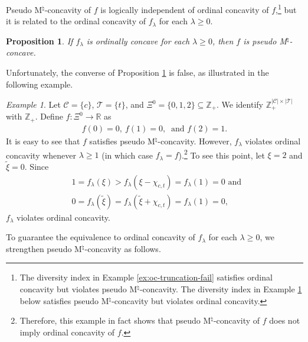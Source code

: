 \documentclass[12pt]{amsart}
\newtheorem{proposition}{Proposition}
\theoremstyle{remark}
\newtheorem{example}{Example}
\begin{document}
Pseudo M$^\natural$-concavity of $f$ is logically independent of ordinal concavity of $f$,\footnote{The diversity index in Example \ref{ex:oc-truncation-fail} satisfies ordinal concavity but violates pseudo M$^\natural$-concavity. The diversity index in Example \ref{ex:truncation-sufficient-fail} below satisfies pseudo M$^\natural$-concavity but violates ordinal concavity.} but it is related to the ordinal concavity of $f_\lambda$ for each $\lambda\geq 0$.

\begin{proposition}\label{prop:truncation-necessary}
If $f_\lambda$ is ordinally concave for each $\lambda\geq 0$, then $f$ is pseudo M$^\natural$-concave.
\end{proposition}

Unfortunately, the converse of Proposition \ref{prop:truncation-necessary} is false, as illustrated in the following example.

\begin{example}\label{ex:truncation-sufficient-fail}
Let $\mathcal{C}=\{c\}$, $\mathcal{T}=\{t\}$, and $\Xi^0=\{0,1,2\}\subseteq \mathbb{Z}_+$. We identify $\mathbb{Z}^{|\mathcal{C}|\times |\mathcal{T}|}_+$ with $\mathbb{Z}_+$. Define
$f:\Xi^0\rightarrow \mathbb{R}$ as
\begin{align*}
f(0)=0, \: f(1)=0, \: \text{ and } f(2)=1.
\end{align*}
It is easy to see that $f$ satisfies pseudo M$^\natural$-concavity. However, $f_\lambda$ violates ordinal concavity whenever $\lambda \geq 1$ (in which case $f_\lambda=f$).\footnote{Therefore,
this example in fact shows that pseudo M$^\natural$-concavity of $f$ does not imply ordinal concavity of $f$.} To see this point, let $\xi=2$ and $\tilde \xi=0$. Since
\begin{align*}
&1=f_\lambda(\xi)>f_\lambda(\xi-\chi_{c,t})=f_\lambda(1)=0 \text{ and } \\
&0=f_\lambda(\tilde \xi)=f_\lambda(\tilde \xi+\chi_{c,t})=f_\lambda(1)=0,
\end{align*}
$f_\lambda$ violates ordinal concavity.
\end{example}
To guarantee the equivalence to ordinal concavity of $f_\lambda$ for each $\lambda\geq 0$, we strengthen pseudo M$^\natural$-concavity as follows.
\end{document}
